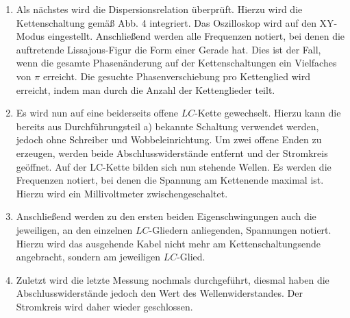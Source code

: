 \begin{enumerate}
\item Als nächstes wird die Dispersionsrelation überprüft. Hierzu wird die
 Kettenschaltung gemäß Abb. 4 integriert. Das Oszilloskop
  wird auf den XY-Modus eingestellt. Anschließend werden alle Frequenzen notiert,
    bei denen die auftretende Lissajous-Figur die Form einer Gerade hat. Dies ist der
     Fall, wenn die gesamte Phasenänderung auf der Kettenschaltungen ein
      Vielfaches von $\pi$ erreicht. Die gesuchte Phasenverschiebung pro Kettenglied
       wird erreicht, indem man durch die Anzahl der Kettenglieder teilt.

\item Es wird nun auf eine beiderseits offene $LC$-Kette gewechselt. Hierzu kann
 die bereits aus Durchführungsteil a) bekannte Schaltung verwendet werden,
  jedoch ohne Schreiber und Wobbeleinrichtung. Um zwei offene Enden zu
   erzeugen, werden beide Abschlusswiderstände entfernt und der Stromkreis geöffnet.
    Auf der LC-Kette bilden sich nun stehende Wellen.
   Es werden die Frequenzen notiert, bei denen die Spannung am Kettenende
    maximal ist. Hierzu wird ein Millivoltmeter zwischengeschaltet.

\item Anschließend werden zu den ersten beiden Eigenschwingungen auch die
 jeweiligen, an den einzelnen $LC$-Gliedern anliegenden, Spannungen notiert. Hierzu wird
  das ausgehende Kabel nicht mehr am Kettenschaltungsende angebracht, sondern
   am jeweiligen $LC$-Glied.

   \item Zuletzt wird die letzte Messung nochmals durchgeführt, diesmal
   haben die Abschlusswiderstände jedoch den Wert des Wellenwiderstandes.
    Der Stromkreis wird daher wieder geschlossen.


\end{enumerate}
